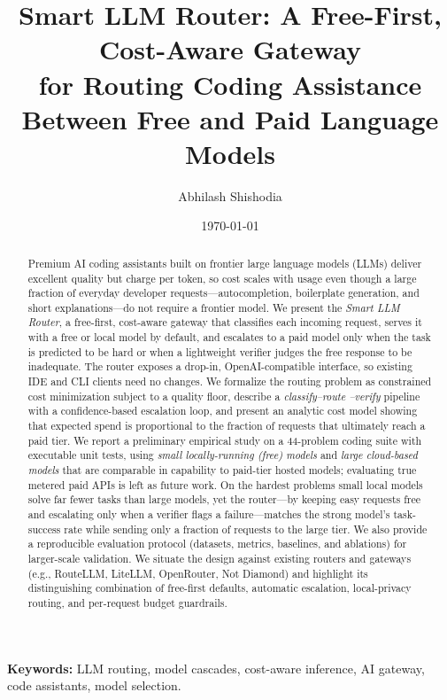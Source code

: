 \documentclass[11pt]{article}
\title{\textbf{Smart LLM Router: A Free-First, Cost-Aware Gateway\\
for Routing Coding Assistance Between Free and Paid Language Models}}
\author[]{Abhilash Shishodia}
\affil[]{\texttt{Independent Researcher}}
\date{\today}
\begin{document}
\maketitle

\begin{abstract}
Premium AI coding assistants built on frontier large language models (LLMs)
deliver excellent quality but charge per token, so cost scales with usage even
though a large fraction of everyday developer requests---autocompletion,
boilerplate generation, and short explanations---do not require a frontier
model. We present the \emph{Smart LLM Router}, a free-first, cost-aware gateway
that classifies each incoming request, serves it with a free or local model by
default, and escalates to a paid model only when the task is predicted to be
hard or when a lightweight verifier judges the free response to be inadequate.
The router exposes a drop-in, OpenAI-compatible interface, so existing IDE and
CLI clients need no changes. We formalize the routing problem as constrained
cost minimization subject to a quality floor, describe a \emph{classify--route
--verify} pipeline with a confidence-based escalation loop, and present an
analytic cost model showing that expected spend is proportional to the fraction
of requests that ultimately reach a paid tier. We report a preliminary
empirical study on a 44-problem coding suite with executable unit tests, using
\emph{small locally-running (free) models} and \emph{large cloud-based models}
that are comparable in capability to paid-tier hosted models; evaluating true
metered paid APIs is left as future work. On the hardest problems small local
models solve far fewer tasks than large models, yet the router---by keeping
easy requests free and escalating only when a verifier flags a failure---matches
the strong model's task-success rate while sending only a fraction of requests
to the large tier. We also provide a reproducible evaluation protocol (datasets,
metrics, baselines, and ablations) for larger-scale validation.
We situate the design against existing routers and gateways
(e.g., RouteLLM, LiteLLM, OpenRouter, Not Diamond) and highlight its
distinguishing combination of free-first defaults, automatic escalation,
local-privacy routing, and per-request budget guardrails.
\end{abstract}

\noindent\textbf{Keywords:} LLM routing, model cascades, cost-aware inference,
AI gateway, code assistants, model selection.

\end{document}
